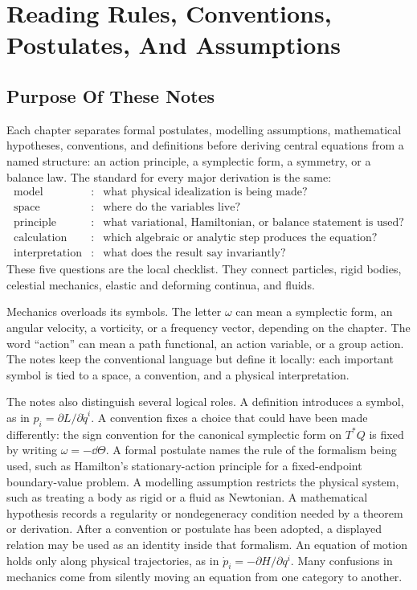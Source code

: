 \chapter[Reading Rules And Logical Roles]{Reading Rules, Conventions, Postulates, And Assumptions}
\label{chap:notation}

\section{Purpose Of These Notes}
\label{sec:notation-purpose}

Each chapter separates formal postulates, modelling assumptions, mathematical
hypotheses, conventions, and definitions before deriving central equations from
a named structure: an action principle, a symplectic form, a symmetry, or a
balance law. The standard for every major derivation is the same:
\[
\begin{array}{rcl}
\text{model} &:& \text{what physical idealization is being made?}\\
\text{space} &:& \text{where do the variables live?}\\
\text{principle} &:& \text{what variational, Hamiltonian, or balance statement is used?}\\
\text{calculation} &:& \text{which algebraic or analytic step produces the equation?}\\
\text{interpretation} &:& \text{what does the result say invariantly?}
\end{array}
\]
These five questions are the local checklist. They connect particles, rigid
bodies, celestial mechanics, elastic and deforming continua, and fluids.

Mechanics overloads its symbols. The letter \(\omega\) can mean a symplectic
form, an angular velocity, a vorticity, or a frequency vector, depending on the
chapter. The word ``action'' can mean a path functional, an action variable, or
a group action. The notes keep the conventional language but define it locally:
each important symbol is tied to a space, a convention, and a physical
interpretation.

The notes also distinguish several logical roles. A definition introduces a
symbol, as in \(p_i=\partial L/\partial\dot q^i\). A convention fixes a choice
that could have been made differently: the sign convention for the canonical
symplectic form on \(T^*Q\) is fixed by writing \(\omega=-\dd\Theta\). A formal
postulate names the rule of the formalism being used, such as Hamilton's
stationary-action principle for a fixed-endpoint boundary-value problem. A
modelling assumption restricts the physical system, such as treating a body as
rigid or a fluid as Newtonian. A mathematical hypothesis records a regularity
or nondegeneracy condition needed by a theorem or derivation. After a
convention or postulate has been adopted, a displayed relation may be used as
an identity inside that formalism. An equation of motion holds only along
physical trajectories, as in \(\dot p_i=-\partial H/\partial q^i\). Many
confusions in mechanics come from silently moving an equation from one category
to another.

